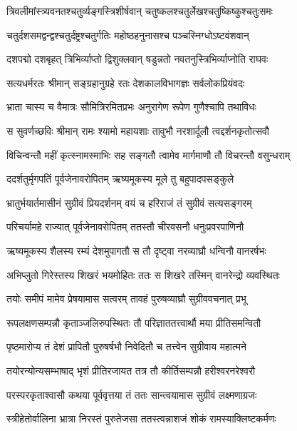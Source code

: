 \twolineshloka
{त्रिवलीमांस्त्र्यवनतश्चतुर्व्यङ्गस्त्रिशीर्षवान्}
{चतुष्कलश्चतुर्लेखश्चतुष्किष्कुश्चतुःसमः} %

\twolineshloka
{चतुर्दशसमद्वन्द्वश्चतुर्दंष्ट्रश्चतुर्गतिः}
{महोष्ठहनुनासश्च पञ्चस्निग्धोऽष्टवंशवान्} %

\twolineshloka
{दशपद्मो दशबृहत् त्रिभिर्व्याप्तो द्विशुक्लवान्}
{षडुन्नतो नवतनुस्त्रिभिर्व्याप्नोति राघवः} %

\twolineshloka
{सत्यधर्मरतः श्रीमान् सङ्ग्रहानुग्रहे रतः}
{देशकालविभागज्ञः सर्वलोकप्रियंवदः} %

\twolineshloka
{भ्राता चास्य च वैमात्रः सौमित्रिरमितप्रभः}
{अनुरागेण रूपेण गुणैश्चापि तथाविधः} %

\twolineshloka
{स सुवर्णच्छविः श्रीमान् रामः श्यामो महायशाः}
{तावुभौ नरशार्दूलौ त्वद्दर्शनकृतोत्सवौ} %

\twolineshloka
{विचिन्वन्तौ महीं कृत्स्नामस्माभिः सह सङ्गतौ}
{त्वामेव मार्गमाणौ तौ विचरन्तौ वसुन्धराम्} %

\twolineshloka
{ददर्शतुर्मृगपतिं पूर्वजेनावरोपितम्}
{ऋष्यमूकस्य मूले तु बहुपादपसङ्कुले} %

\twolineshloka
{भ्रातुर्भयार्तमासीनं सुग्रीवं प्रियदर्शनम्}
{वयं च हरिराजं तं सुग्रीवं सत्यसङ्गरम्} %

\twolineshloka
{परिचर्यामहे राज्यात् पूर्वजेनावरोपितम्}
{ततस्तौ चीरवसनौ धनुःप्रवरपाणिनौ} %

\twolineshloka
{ऋष्यमूकस्य शैलस्य रम्यं देशमुपागतौ}
{स तौ दृष्ट्वा नरव्याघ्रौ धन्विनौ वानरर्षभः} %

\twolineshloka
{अभिप्लुतो गिरेस्तस्य शिखरं भयमोहितः}
{ततः स शिखरे तस्मिन् वानरेन्द्रो व्यवस्थितः} %

\twolineshloka
{तयोः समीपं मामेव प्रेषयामास सत्वरम्}
{तावहं पुरुषव्याघ्रौ सुग्रीववचनात् प्रभू} %

\twolineshloka
{रूपलक्षणसम्पन्नौ कृताञ्जलिरुपस्थितः}
{तौ परिज्ञाततत्त्वार्थौ मया प्रीतिसमन्वितौ} %

\twolineshloka
{पृष्ठमारोप्य तं देशं प्रापितौ पुरुषर्षभौ}
{निवेदितौ च तत्त्वेन सुग्रीवाय महात्मने} %

\twolineshloka
{तयोरन्योन्यसम्भाषाद् भृशं प्रीतिरजायत}
{तत्र तौ कीर्तिसम्पन्नौ हरीश्वरनरेश्वरौ} %

\twolineshloka
{परस्परकृताश्वासौ कथया पूर्ववृत्तया}
{तं ततः सान्त्वयामास सुग्रीवं लक्ष्मणाग्रजः} %

\twolineshloka
{स्त्रीहेतोर्वालिना भ्रात्रा निरस्तं पुरुतेजसा}
{ततस्त्वन्नाशजं शोकं रामस्याक्लिष्टकर्मणः} %

